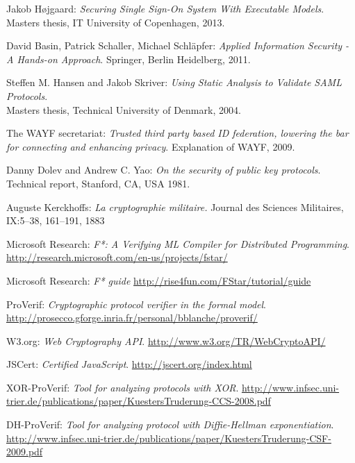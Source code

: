 \documentclass[twosided]{report}
\begin{document}
\begin{thebibliography}{9}

  Jakob H{\o}jgaard:
  \emph{Securing Single Sign-On System With Executable Models}.
  Masters thesis, IT University of Copenhagen,
  2013.

  David Basin, Patrick Schaller, Michael Schl{\"a}pfer:
  \emph{Applied Information Security - A Hands-on Approach}.
  Springer, Berlin Heidelberg,
  2011.

  Steffen M. Hansen and Jakob Skriver:
  \emph{Using Static Analysis to Validate SAML Protocols}.
  \\Masters thesis, Technical University of Denmark,
  2004.

 The WAYF secretariat:
 \emph{Trusted third party based ID federation, lowering the bar for connecting and enhancing privacy}.
 Explanation of WAYF, 2009.

 Danny Dolev and Andrew C. Yao:
 \emph{On the security of public key protocols}.
 Technical report, Stanford, CA, USA
 1981.

 Auguste Kerckhoffs:
 \emph{La cryptographie militaire.}
 Journal des Sciences Militaires, IX:5–38, 161–191, 1883

 Microsoft Research:
 \emph{F*: A Verifying ML Compiler for Distributed Programming}.
 \url{http://research.microsoft.com/en-us/projects/fstar/}

 Microsoft Research:
 \emph{F* guide}
 \url{http://rise4fun.com/FStar/tutorial/guide}

 ProVerif:
 \emph{Cryptographic protocol verifier in the formal model}.
 \url{http://prosecco.gforge.inria.fr/personal/bblanche/proverif/}

 W3.org: 
 \emph{Web Cryptography API}.
 \url{http://www.w3.org/TR/WebCryptoAPI/}
 
 JSCert:
 \emph{Certified JavaScript}.
 \url{http://jscert.org/index.html}

 XOR-ProVerif:
 \emph{Tool for analyzing protocols with XOR}.
 \url{http://www.infsec.uni-trier.de/publications/paper/KuestersTruderung-CCS-2008.pdf}

 DH-ProVerif:
 \emph{Tool for analyzing protocol with Diffie-Hellman exponentiation}.
 \url{http://www.infsec.uni-trier.de/publications/paper/KuestersTruderung-CSF-2009.pdf}


\end{thebibliography}
\end{document}

